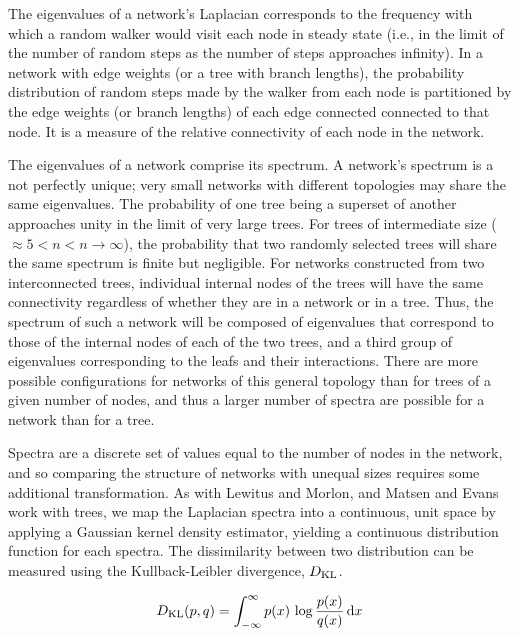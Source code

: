 The eigenvalues of a network's Laplacian corresponds to the frequency with which a random walker would visit each node in steady state (i.e., in the limit of the number of random steps as the number of steps approaches infinity). In a network with edge weights (or a tree with branch lengths), the probability distribution of random steps made by the walker from each node is partitioned by the edge weights (or branch lengths) of each edge connected connected to that node. It is a measure of the relative connectivity of each node in the network. 

The eigenvalues of a network comprise its spectrum. A network's spectrum is a not perfectly unique; very small networks with different topologies may share the same eigenvalues. The probability of one tree being a superset of another approaches unity in the limit of very large trees. For trees of intermediate size ($ \approx 5 < n < n \rightarrow \infty$), the probability that two randomly selected trees will share the same spectrum is finite but negligible. \cite{matsen2012ubiquity} For networks constructed from two interconnected trees, individual internal nodes of the trees will have the same connectivity regardless of whether they are in a network or in a tree. Thus, the spectrum of such a network will be composed of eigenvalues that correspond to those of the internal nodes of each of the two trees, and a third group of eigenvalues corresponding to the leafs and their interactions. There are more possible configurations for networks of this general topology than for trees of a given number of nodes, and thus a larger number of spectra are possible for a network than for a tree.

Spectra are a discrete set of values equal to the number of nodes in the network, and so comparing the structure of networks with unequal sizes requires some additional transformation. As with Lewitus and Morlon, and Matsen and Evans \cite{lewitus2015characterizing, matsen2012ubiquity} work with trees, we map the Laplacian spectra into a continuous, unit space by applying a Gaussian kernel density estimator, yielding a continuous distribution function for each spectra. The dissimilarity between two distribution can be measured using the Kullback-Leibler divergence, $D_{\rm KL}$. 

\begin{equation}
    D_{\rm KL}( p, q ) = \int_{-\infty}^\infty p(x) \, \log\frac{p(x)}{q(x)} \, {\rm d}x
\end{equation}

